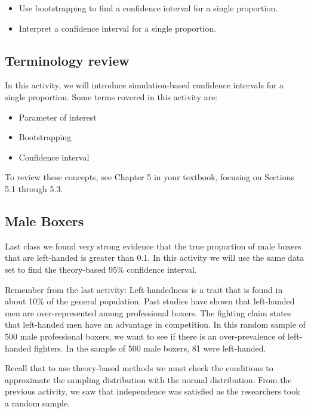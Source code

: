 \documentclass[
]{report}
\begin{document}
\begin{itemize}
\item
  Use bootstrapping to find a confidence interval for a single proportion.
\item
  Interpret a confidence interval for a single proportion.
\end{itemize}

\hypertarget{terminology-review-14}{%
\subsection{Terminology review}\label{terminology-review-14}}

In this activity, we will introduce simulation-based confidence intervals for a single proportion. Some terms covered in this activity are:

\begin{itemize}
\item
  Parameter of interest
\item
  Bootstrapping
\item
  Confidence interval
\end{itemize}

To review these concepts, see Chapter 5 in your textbook, focusing on Sections 5.1 through 5.3.

\hypertarget{male-boxers}{%
\subsection{Male Boxers}\label{male-boxers}}

Last class we found very strong evidence that the true proportion of male boxers that are left-handed is greater than 0.1. In this activity we will use the same data set to find the theory-based 95\% confidence interval.

Remember from the last activity: Left-handedness is a trait that is found in about 10\% of the general population. Past studies have shown that left-handed men are over-represented among professional boxers. The fighting claim states that left-handed men have an advantage in competition. In this random sample of 500 male professional boxers, we want to see if there is an over-prevalence of left-handed fighters. In the sample of 500 male boxers, 81 were left-handed.

Recall that to use theory-based methods we must check the conditions to approximate the sampling distribution with the normal distribution. From the previous activity, we saw that independence was satisfied as the researchers took a random sample.
\end{document}
